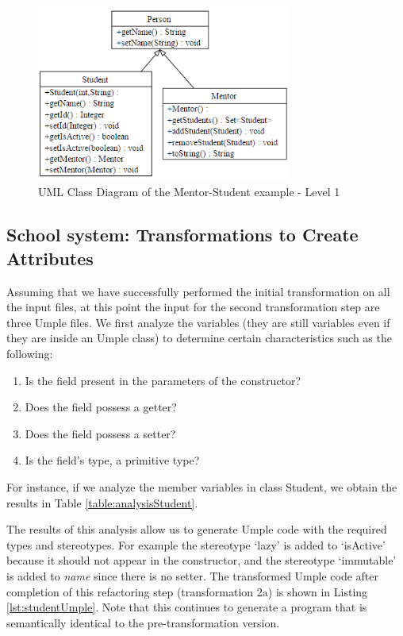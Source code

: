 \begin{figure}[h]
\centering
\includegraphics[width=0.75\textwidth]{Figures/Example1a1.png} 
\caption{UML Class Diagram of the Mentor-Student example - Level 1}
\label{fig:Example1a1}
\end{figure}

\subsection{School system: Transformations to Create Attributes}

Assuming that we have successfully performed the initial transformation on all the input files, at this point the input for the second transformation step are three Umple files.
We first analyze the variables (they are still variables even if they are inside an Umple class) to determine certain characteristics such as the following:

\begin{enumerate}
\item Is the field present in the parameters of the constructor?
\item Does the field possess a getter?
\item Does the field possess a setter?
\item Is the field's type, a primitive type?
\end{enumerate}

For instance, if we analyze the member variables in class Student, we obtain the results in Table \ref{table:analysisStudent}.


The results of this analysis allow us to generate Umple code with the required types and stereotypes. For example the stereotype `lazy' is added to `isActive' because it should not appear in the constructor, and the stereotype `immutable' is added to \textit{name} since there is no setter. The transformed Umple code after completion of this refactoring step (transformation 2a) is shown in Listing \ref{lst:studentUmple}. Note that this continues to generate a program that is semantically identical to the pre-transformation version.

